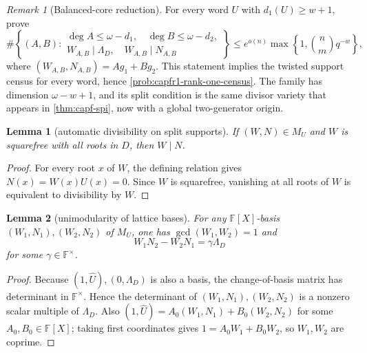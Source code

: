 \documentclass[11pt]{article}
\newtheorem{lemma}[lemma]{Lemma}
\theoremstyle{definition}
\theoremstyle{remark}
\newtheorem{remark}[remark]{Remark}
\newcommand{\F}{\mathbb{F}}
\begin{document}
\begin{remark}[Balanced-core reduction]\label{prob:capfr1-balanced-core}
For every word \(U\) with \(d_1(U)\ge w+1\), prove
\[
        \#\left\{(A,B):
\begin{array}{l}
\deg A\le\omega-d_1,\quad \deg B\le\omega-d_2,\\
W_{A,B}\mid\Lambda_D,\quad W_{A,B}\mid N_{A,B}
\end{array}
\right\}
\le e^{o(n)}\max\left\{1,\binom n m q^{-w}\right\},
\]
where \((W_{A,B},N_{A,B})=Ag_1+Bg_2\).  This statement implies the twisted support census for every word, hence \cref{prob:capfr1-rank-one-census}.  The family has dimension \(\omega-w+1\), and its split condition is the same divisor variety that appears in \cref{thm:capf-spi}, now with a global two-generator origin.
\end{remark}

\begin{lemma}[automatic divisibility on split supports]\label{lem:capfr1-autodiv}
If \((W,N)\in M_U\) and \(W\) is squarefree with all roots in \(D\), then \(W\mid N\).
\end{lemma}

\begin{proof}
For every root \(x\) of \(W\), the defining relation gives \(N(x)=W(x)U(x)=0\).  Since \(W\) is squarefree, vanishing at all roots of \(W\) is equivalent to divisibility by \(W\).
\end{proof}

\begin{lemma}[unimodularity of lattice bases]\label{lem:capfr1-unimodular}
For any \(\F[X]\)-basis \((W_1,N_1),(W_2,N_2)\) of \(M_U\), one has \(\gcd(W_1,W_2)=1\) and
\[
        W_1N_2-W_2N_1=\gamma\Lambda_D
\]
for some \(\gamma\in\F^\times\).
\end{lemma}

\begin{proof}
Because \((1,\widehat U),(0,\Lambda_D)\) is also a basis, the change-of-basis matrix has determinant in \(\F^\times\).  Hence the determinant of \((W_1,N_1),(W_2,N_2)\) is a nonzero scalar multiple of \(\Lambda_D\).  Also \((1,\widehat U)=A_0(W_1,N_1)+B_0(W_2,N_2)\) for some \(A_0,B_0\in\F[X]\); taking first coordinates gives \(1=A_0W_1+B_0W_2\), so \(W_1,W_2\) are coprime.
\end{proof}
\end{document}
